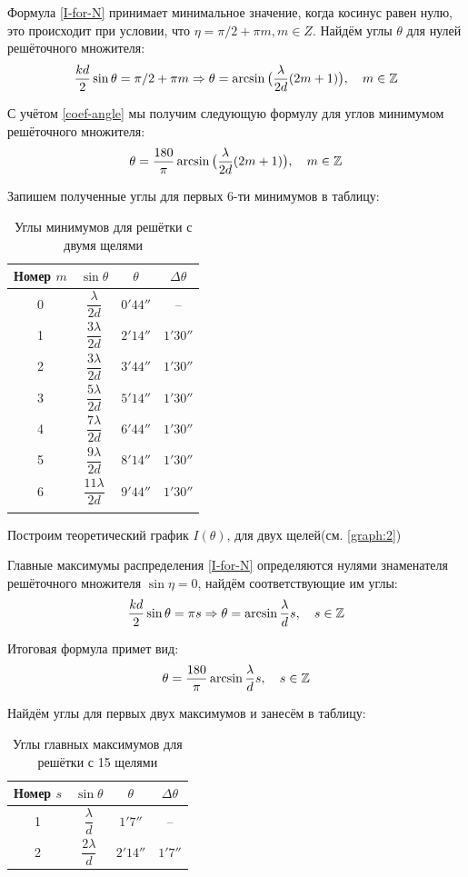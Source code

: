 Формула \cref{I-for-N} принимает минимальное значение, когда косинус равен нулю, это происходит при условии, что $\eta = \pi / 2 + \pi m, m \in Z$. Найдём углы $\theta$ для нулей решёточного множителя:
\begin{align}
	\frac{kd}{2} \sin \theta = \pi / 2 + \pi m \Rightarrow \theta = 
	\arcsin \big( \frac{\lambda}{2d}(2m + 1) \big), \quad m \in \mathbb{Z}
\end{align}

С учётом \cref{coef-angle} мы получим следующую формулу для углов минимумом решёточного множителя:
\[
\theta = \frac{180}{\pi}
\arcsin \big( \frac{\lambda}{2d}(2m + 1) \big), \quad m \in \mathbb{Z}
\]

Запишем полученные углы для первых 6-ти минимумов в таблицу:

\renewcommand{\arraystretch}{1.9}
\begin{table}[H]
	\centering
	\caption{Углы минимумов для решётки с двумя щелями}
	\begin{tabular}{cccc}
		\toprule
		Номер $m$ & $\sin \theta$ & $\theta$ & $\Delta \theta$ \\
		\midrule
		0 & $\dfrac{\lambda}{2d}$   & $ 0' 44''$        & -- \\
		1 & $\dfrac{3\lambda}{2d}$  & $ 2' 14''$ & $1' 30''$ \\
		2 & $\dfrac{3\lambda}{2d}$  & $ 3' 44''$ & $1' 30''$ \\
		3 & $\dfrac{5\lambda}{2d}$  & $ 5' 14''$ & $1' 30''$ \\
		4 & $\dfrac{7\lambda}{2d}$  & $ 6' 44''$ & $1' 30''$ \\
		5 & $\dfrac{9\lambda}{2d}$  & $ 8' 14''$ & $1' 30''$ \\
		6 & $\dfrac{11\lambda}{2d}$ & $ 9' 44''$ & $1' 30''$ \\
		\bottomrule
		\label{tb:2}
	\end{tabular}
\end{table}
\renewcommand{\arraystretch}{1}
Построим теоретический график $I(\theta)$, для двух щелей(см. \cref{graph:2})

Главные максимумы распределения \cref{I-for-N} определяются нулями знаменателя решёточного множителя $\sin \eta = 0$, найдём соответствующие им углы:
\[
\frac{kd}{2} \sin \theta = \pi s \Rightarrow \theta = \arcsin{\frac{\lambda}{d}s}, \quad s \in \mathbb{Z}
\]

Итоговая формула примет вид:
\[
\theta = \frac{180}{\pi} \arcsin{\frac{\lambda}{d}s}, \quad s \in \mathbb{Z}
\]

Найдём углы для первых двух максимумов и занесём в таблицу:
\renewcommand{\arraystretch}{1.8}
\begin{table}[H]
	\centering
	\caption{Углы главных максимумов для решётки с 15 щелями}
	\begin{tabular}{cccc}
		\toprule
		Номер $s$ & $\sin \theta$ & $\theta$ & $\Delta \theta$ \\
		\midrule
		1 & $\dfrac{\lambda}{d}$  & $1' 7''$ & -- \\
		2 & $\dfrac{2\lambda}{d}$ & $2' 14''$ & $1' 7''$ \\
		\bottomrule
	\end{tabular}
	\label{tb:3}
\end{table}
\renewcommand{\arraystretch}{1}


